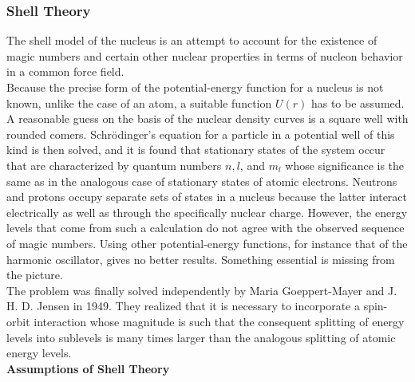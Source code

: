 \subsubsection{Shell Theory}
The shell model of the nucleus is an attempt to account for the existence of magic numbers and certain other nuclear properties in terms of nucleon behavior in a common force field.\\
Because the precise form of the potential-energy function for a nucleus is not known, unlike the case of an atom, a suitable function $U(r)$ has to be assumed. A reasonable guess on the basis of the nuclear density curves is a square well with rounded comers. Schrödinger's equation for a particle in a potential well of this kind is then solved, and it is found that stationary states of the system occur that are characterized by quantum numbers $n, l$, and $m_{l}$ whose significance is the same as in the analogous case of stationary states of atomic electrons. Neutrons and protons occupy separate sets of states in a nucleus because the latter interact electrically as well as through the specifically nuclear charge. However, the energy levels that come from such a calculation do not agree with the observed sequence of magic numbers. Using other potential-energy functions, for instance that of the harmonic oscillator, gives no better results. Something essential is missing from the picture.\\
The problem was finally solved independently by Maria Goeppert-Mayer and J. H. D. Jensen in 1949. They realized that it is necessary to incorporate a spin-orbit interaction whose magnitude is such that the consequent splitting of energy levels into sublevels is many times larger than the analogous splitting of atomic energy levels.\\
\textbf{Assumptions of Shell Theory}
